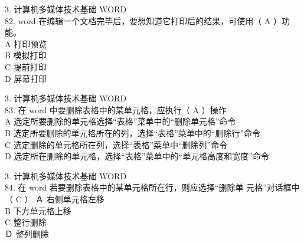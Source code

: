 \documentclass[aspectratio=169]{beamer}
\begin{document}
\begin{frame}[t]{3. 计算机多媒体技术基础} \vspace{20pt}
    WORD\\
    82. word 在编辑一个文档完毕后，要想知道它打印后的结果，可使用（ A ）功能。\\
    A 打印预览\\ B 模拟打印\\ C 提前打印\\ D 屏幕打印\\
\end{frame}



\begin{frame}[t]{3. 计算机多媒体技术基础} \vspace{20pt}
    WORD\\
83. 在 word 中要删除表格中的某单元格，应执行（ A ）操作\\

A 选定所要删除的单元格选择“表格”菜单中的“删除单元格”命令\\
B 选定所要删除的单元格所在的列，选择“表格”菜单中的“删除行”命令\\
C 选定删除的单元格所在列，选择“表格”菜单中“删除列”命令\\
D 选定所在删除的单元格，选择“表格”菜单中的“单元格高度和宽度”命令\\
\end{frame}




\begin{frame}[t]{3. 计算机多媒体技术基础} \vspace{20pt}
    WORD\\
84. 在 word 若要删除表格中的某单元格所在行，则应选择“删除单
元格”对话框中（ C ）
Ａ 右侧单元格左移\\ B 下方单元格上移\\
C 整行删除\\ Ｄ 整列删除\\

\end{frame}
\end{document}
